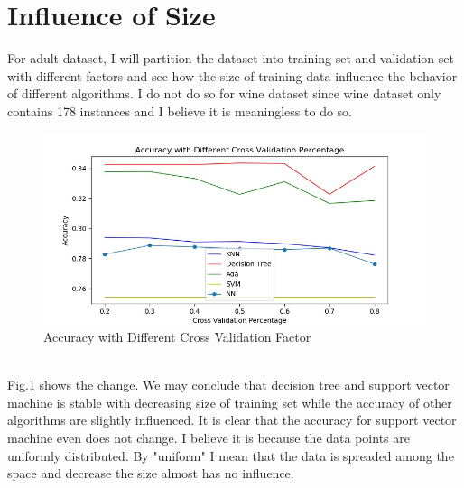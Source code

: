 \documentclass[11pt]{article}
\begin{document}
\section{Influence of Size}
For adult dataset, I will partition the dataset into training set and validation set with different factors and see how the size of training data influence the behavior of different algorithms. I do not do so for wine dataset since wine dataset only contains 178 instances and I believe it is meaningless to do so.
\begin{figure}[h!]
  \includegraphics[width=\linewidth]{./adult/compare.jpg}
  \caption{Accuracy with Different Cross Validation Factor}
  \label{fig:compare}
\end{figure}\\
Fig.\ref{fig:compare} shows the change. We may conclude that decision tree and support vector machine is stable with decreasing size of training set while the accuracy of other algorithms are slightly influenced. It is clear that the accuracy for support vector machine even does not change. I believe it is because the data points are uniformly distributed. By "uniform" I mean that the data is spreaded among the space and decrease the size almost has no influence.
\end{document}
